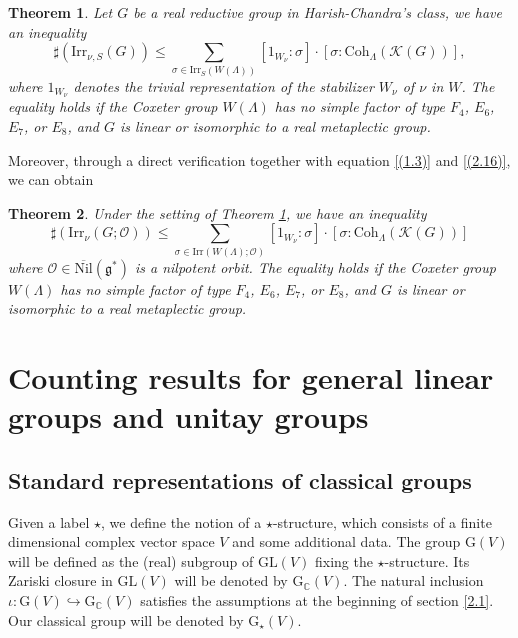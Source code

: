 \documentclass[12pt, a4paper]{amsart}
\numberwithin{equation}{section}
\newtheorem{thm}{Theorem}[section]
\newcommand{\BC}{{\mathbb {C}}}
\newcommand{\CK}{{\mathcal {K}}}
\newcommand{\CO}{{\mathcal {O}}}
\newcommand{\fg}{\mathfrak{g}}
\newcommand{\GL}{{\mathrm{GL}}}
\newcommand{\G}{{\mathrm{G}}}
\newcommand{\Irr}{{\mathrm{Irr}}}
\newcommand{\Nil}{{\mathrm{Nil}}}
\renewcommand{\bar}{\overline}
\begin{document}
\begin{thm}\label{counting}
    Let $G$ be a real reductive group in Harish-Chandra's class, we have an inequality
    \begin{equation}
        \sharp(\Irr_{\nu,S}(G)) \leq \sum_{\sigma \in \Irr_{S}(W(\Lambda))} [1_{W_\nu}:\sigma] \cdot [\sigma:\mathrm{Coh}_{\Lambda}(\CK(G))],
    \end{equation}
    where $1_{W_\nu}$ denotes the trivial representation of the stabilizer $W_\nu$ of $\nu$ in $W$. The equality holds if the Coxeter group $W(\Lambda)$ has no simple factor of type $F_4$, $E_6$, $E_7$, or $E_8$, and $G$ is linear or isomorphic to a real metaplectic group.
\end{thm}

Moreover, through a direct verification together with equation \ref{(1.3)} and \ref{(2.16)}, we can obtain

\begin{thm}
    Under the setting of Theorem \ref{counting}, we have an inequality
    \begin{equation}
        \sharp(\Irr_{\nu}(G;\CO)) \leq \sum_{\sigma \in \Irr(W(\Lambda);\CO)}[1_{W_\nu}:\sigma] \cdot [\sigma:\mathrm{Coh}_{\Lambda}(\CK(G))]
    \end{equation}
    where $\CO \in \bar{\Nil}(\fg^*)$ is a nilpotent orbit.  The equality holds if the Coxeter group $W(\Lambda)$ has no simple factor of type $F_4$, $E_6$, $E_7$, or $E_8$, and $G$ is linear or isomorphic to a real metaplectic group.
\end{thm}




\section{Counting results for general linear groups and unitay groups}

   \subsection{Standard representations of classical groups}\label{3.1}

   Given a label $\star$, we define the notion of a $\star$-structure, which consists of a finite dimensional complex vector space $V$ and some additional data. The group $\G(V)$ will be defined as the (real) subgroup of $\GL(V)$ fixing the $\star$-structure. Its Zariski closure in $\GL(V)$ will be denoted by $\G_{\BC}(V)$. The natural inclusion $\iota: \G(V) \hookrightarrow \G_{\BC}(V)$ satisfies the assumptions at the beginning of section \ref{2.1}. Our classical group will be denoted by $\G_{\star}(V)$.
\end{document}
